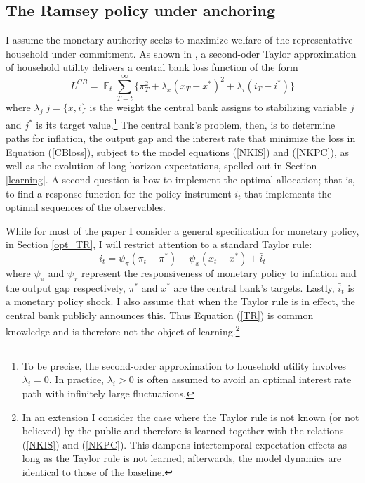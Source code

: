\documentclass[11pt]{article}
\renewcommand{\[}{\begin{equation}}
\renewcommand{\]}{\end{equation}}
\DeclareMathOperator{\E}{\mathbb{E}}
\begin{document}
\subsection{The Ramsey policy under anchoring}\label{ramsey}
I assume the monetary authority seeks to maximize welfare of the representative household under commitment. As shown in \cite{woodford2011interest}, a second-oder Taylor approximation of household utility delivers a central bank loss function of the form
\begin{equation}
L^{CB} =\E_t \sum_{T=t}^{\infty}\{\pi_T^2 +\lambda_x(x_T - x^*)^2 +\lambda_i(i_T - i^*)\} \label{CBloss}
\end{equation}
where $\lambda_j \; j=\{x,i\}$ is the weight the central bank assigns to stabilizing variable $j$ and $j^*$ is its target value.\footnote{To be precise, the second-order approximation to household utility involves $\lambda_i = 0$. In practice, $\lambda_i > 0$ is often assumed to avoid an optimal interest rate path with infinitely large fluctuations.} The central bank's problem, then, is to determine paths for inflation, the output gap and the interest rate that minimize the loss in Equation (\ref{CBloss}), subject to the model equations (\ref{NKIS}) and (\ref{NKPC}), as well as the evolution of long-horizon expectations, spelled out in Section \ref{learning}. A second question is how to implement the optimal allocation; that is, to find a response function for the policy instrument $i_t$ that implements the optimal sequences of the observables.

While for most of the paper I consider a general specification for monetary policy, in Section \ref{opt_TR}, I will restrict attention to a standard Taylor rule:
\begin{equation}
i_t = \psi_{\pi}(\pi_t -\pi^*) + \psi_{x} (x_t -x^*) + \bar{i}_t  \label{TR}
\end{equation}
where $\psi_{\pi}$ and $\psi_{x}$ represent the responsiveness of monetary policy to inflation and the output gap respectively, $\pi^*$ and $x^*$ are the central bank's targets. Lastly, $\bar{i}_t$ is a monetary policy shock. I also assume that when the Taylor rule is in effect, the central bank publicly announces this. Thus Equation (\ref{TR}) is common knowledge and is therefore not the object of learning.\footnote{In an extension I consider the case where the Taylor rule is not known (or not believed) by the public and therefore is learned together with the relations (\ref{NKIS}) and (\ref{NKPC}). This dampens intertemporal expectation effects as long as the Taylor rule is not learned; afterwards, the model dynamics are identical to those of the baseline.} 
 
\end{document}
